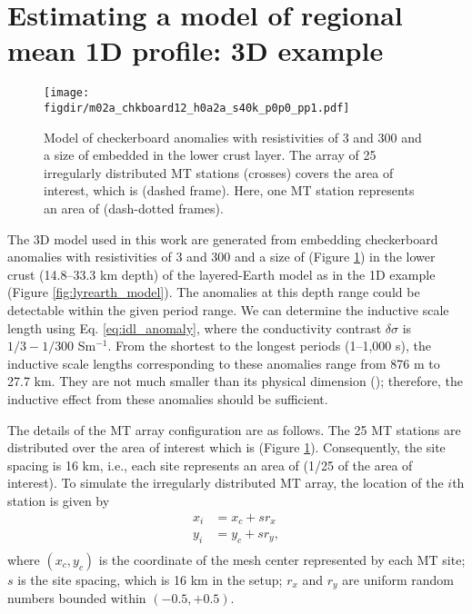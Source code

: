 
\renewcommand{\thisdir}{_content/reg1d_synthetic_3d}
\renewcommand{\figdir}{\thisdir/_fig}

\section[3D examples]{Estimating a model of regional mean 1D profile: 3D example}\label{sect:example_3d}

\begin{figure}[!b]
	\centering
	\texttt{[image: \\figdir/m02a\_chkboard12\_h0a2a\_s40k\_p0p0\_pp1.pdf]}
	\caption[Checkerboard model and MT array setting used in this study]{Model of checkerboard anomalies with resistivities of 3 and 300 {\Ohmm} and a size of   embedded in the lower crust layer. The array of 25 irregularly distributed MT stations (crosses) covers the area of interest, which is {} (dashed frame). Here, one MT station represents an area of {} (dash-dotted frames).}
	\label{fig:model3d_setting}
\end{figure}

The 3D model used in this work are generated from embedding checkerboard anomalies with resistivities of 3 and 300 {\Ohmm} and a size of  (Figure \ref{fig:model3d_setting}) in the lower crust (14.8--33.3 km depth) of the layered-Earth model as in the 1D example (Figure \ref{fig:lyrearth_model}). The anomalies at this depth range could be detectable within the given period range.
% 
We can determine the inductive scale length using Eq. \eqref{eq:idl_anomaly}, where the conductivity contrast $\delta \sigma$ is $1/3 - 1/300$ Sm$^{-1}$. From the shortest to the longest periods (1--1,000 s), the inductive scale lengths corresponding to these anomalies range from 876 m to 27.7 km. They are not much smaller than its physical dimension (); therefore, the inductive effect from these anomalies should be sufficient.

The details of the MT array configuration are as follows. The 25 MT stations are distributed over the area of interest which is  (Figure \ref{fig:model3d_setting}). Consequently, the site spacing is 16 km, i.e., each site represents an area of  (1/25 of the area of interest). To simulate the irregularly distributed MT array, the location of the $i$th station is given by
\begin{equation*}
	\begin{split}
		x_i & = x_c + s r_x \\
		y_i & = y_c + s r_y, \\
	\end{split}
\end{equation*}
where $(x_c,y_c)$ is the coordinate of the mesh center represented by each MT site; $s$ is the site spacing, which is 16 km in the setup; $r_x$ and $r_y$ are uniform random numbers bounded within $(-0.5,+0.5)$.

